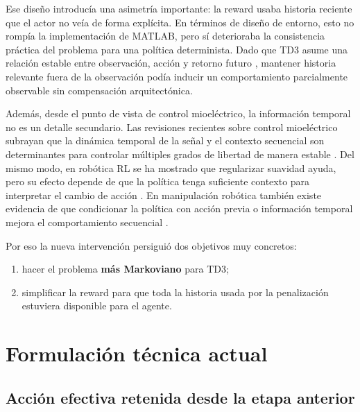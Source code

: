 \documentclass[11pt,a4paper]{article}
\begin{document}
Ese dise\~no introduc\'ia una asimetr\'ia importante: la reward usaba historia reciente que el actor no ve\'ia de forma expl\'icita. En t\'erminos de dise\~no de entorno, esto no romp\'ia la implementaci\'on de MATLAB, pero s\'i deterioraba la consistencia pr\'actica del problema para una pol\'itica determinista. Dado que TD3 asume una relaci\'on estable entre observaci\'on, acci\'on y retorno futuro \citep{fujimoto2018td3,mathworks_td3_agent}, mantener historia relevante fuera de la observaci\'on pod\'ia inducir un comportamiento parcialmente observable sin compensaci\'on arquitect\'onica.

Adem\'as, desde el punto de vista de control mioel\'ectrico, la informaci\'on temporal no es un detalle secundario. Las revisiones recientes sobre control mioel\'ectrico subrayan que la din\'amica temporal de la se\~nal y el contexto secuencial son determinantes para controlar m\'ultiples grados de libertad de manera estable \citep{chen2023review}. Del mismo modo, en rob\'otica RL se ha mostrado que regularizar suavidad ayuda, pero su efecto depende de que la pol\'itica tenga suficiente contexto para interpretar el cambio de acci\'on \citep{lee2024smoothness}. En manipulaci\'on rob\'otica tambi\'en existe evidencia de que condicionar la pol\'itica con acci\'on previa o informaci\'on temporal mejora el comportamiento secuencial \citep{kumra2022pacromannet}.

Por eso la nueva intervenci\'on persigui\'o dos objetivos muy concretos:
\begin{enumerate}[leftmargin=1.2cm]
    \item hacer el problema \textbf{m\'as Markoviano} para TD3;
    \item simplificar la reward para que toda la historia usada por la penalizaci\'on estuviera disponible para el agente.
\end{enumerate}

\section{Formulaci\'on t\'ecnica actual}

\subsection{Acci\'on efectiva retenida desde la etapa anterior}
\end{document}
